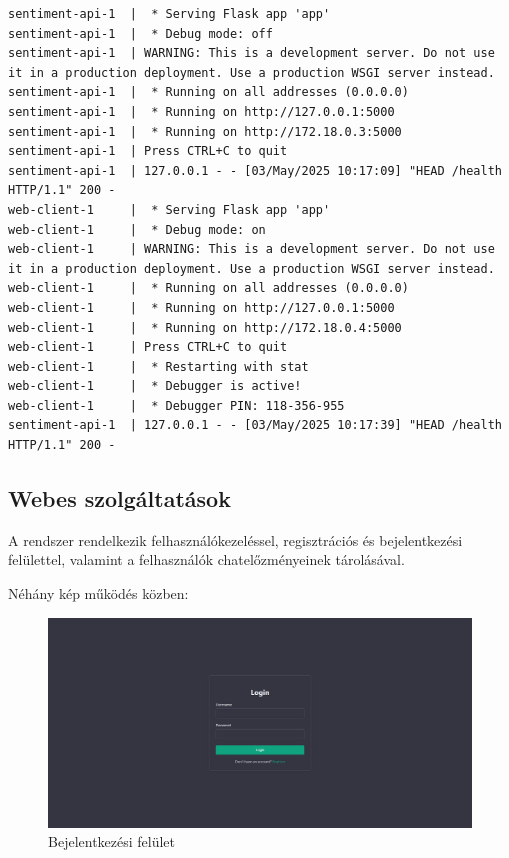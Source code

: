 \documentclass[12pt]{article}
\begin{document}
\begin{lstlisting}[style=docker]
sentiment-api-1  |  * Serving Flask app 'app'
sentiment-api-1  |  * Debug mode: off
sentiment-api-1  | WARNING: This is a development server. Do not use it in a production deployment. Use a production WSGI server instead.
sentiment-api-1  |  * Running on all addresses (0.0.0.0)
sentiment-api-1  |  * Running on http://127.0.0.1:5000
sentiment-api-1  |  * Running on http://172.18.0.3:5000
sentiment-api-1  | Press CTRL+C to quit
sentiment-api-1  | 127.0.0.1 - - [03/May/2025 10:17:09] "HEAD /health HTTP/1.1" 200 -
web-client-1     |  * Serving Flask app 'app'
web-client-1     |  * Debug mode: on
web-client-1     | WARNING: This is a development server. Do not use it in a production deployment. Use a production WSGI server instead.
web-client-1     |  * Running on all addresses (0.0.0.0)
web-client-1     |  * Running on http://127.0.0.1:5000
web-client-1     |  * Running on http://172.18.0.4:5000
web-client-1     | Press CTRL+C to quit
web-client-1     |  * Restarting with stat
web-client-1     |  * Debugger is active!
web-client-1     |  * Debugger PIN: 118-356-955
sentiment-api-1  | 127.0.0.1 - - [03/May/2025 10:17:39] "HEAD /health HTTP/1.1" 200 -
\end{lstlisting}

\subsection{Webes szolgáltatások}

A rendszer rendelkezik felhasználókezeléssel, regisztrációs és bejelentkezési felülettel, valamint a felhasználók chatelőzményeinek tárolásával.

Néhány kép működés közben:

\begin{figure}[H]
    \centering
    \includegraphics[width=\linewidth]{images/01_login.png}
    \caption{Bejelentkezési felület}
    \label{fig:01_login}
\end{figure}
\end{document}
